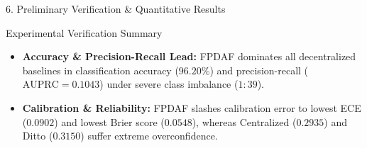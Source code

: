 \documentclass[aspectratio=169, 11pt]{beamer}
\begin{document}
\begin{frame}{6. Preliminary Verification \& Quantitative Results}
    \begin{block}{Experimental Verification Summary}
        \footnotesize
        \begin{itemize}
            \item \textbf{Accuracy \& Precision-Recall Lead:} FPDAF dominates all decentralized baselines in classification accuracy ($\mathbf{96.20\%}$) and precision-recall ($\text{AUPRC} = \mathbf{0.1043}$) under severe class imbalance ($1:39$).
            \item \textbf{Calibration \& Reliability:} FPDAF slashes calibration error to lowest ECE ($\mathbf{0.0902}$) and lowest Brier score ($\mathbf{0.0548}$), whereas Centralized ($0.2935$) and Ditto ($0.3150$) suffer extreme overconfidence.
        \end{itemize}
    \end{block}
\end{frame}
\end{document}

